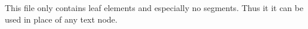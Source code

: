 This file only contains leaf elements and especially no segments.
Thus it it can be used in place of any text node.
